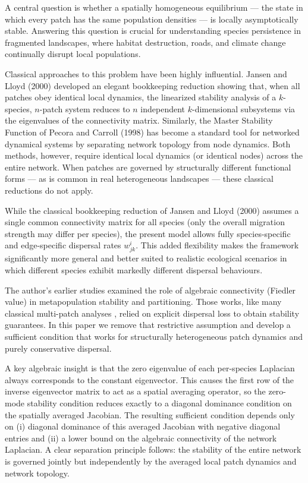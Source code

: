 \documentclass[12pt,a4paper]{article}
\theoremstyle{definition}
\begin{document}
A central question is whether a spatially homogeneous equilibrium --- the state in which every patch has the same population densities --- is locally asymptotically stable. Answering this question is crucial for understanding species persistence in fragmented landscapes, where habitat destruction, roads, and climate change continually disrupt local populations.

Classical approaches to this problem have been highly influential. Jansen and Lloyd (2000) developed an elegant bookkeeping reduction showing that, when all patches obey identical local dynamics, the linearized stability analysis of a \(k\)-species, \(n\)-patch system reduces to \(n\) independent \(k\)-dimensional subsystems via the eigenvalues of the connectivity matrix. Similarly, the Master Stability Function of Pecora and Carroll (1998) has become a standard tool for networked dynamical systems by separating network topology from node dynamics. Both methods, however, require identical local dynamics (or identical nodes) across the entire network. When patches are governed by structurally different functional forms --- as is common in real heterogeneous landscapes --- these classical reductions do not apply.

While the classical bookkeeping reduction of Jansen and Lloyd (2000) assumes a single common connectivity matrix for all species (only the overall migration strength may differ per species), the present model allows fully species-specific and edge-specific dispersal rates $  w^i_{jk}  $. This added flexibility makes the framework significantly more general and better suited to realistic ecological scenarios in which different species exhibit markedly different dispersal behaviours.

The author's earlier studies \cite{kumar2019,kumar2021} examined the role of algebraic connectivity (Fiedler value) in metapopulation stability and partitioning. Those works, like many classical multi-patch analyses \cite{ruxton1997,briggs2004}, relied on explicit dispersal loss to obtain stability guarantees. In this paper we remove that restrictive assumption and develop a sufficient condition that works for structurally heterogeneous patch dynamics and purely conservative dispersal.

A key algebraic insight is that the zero eigenvalue of each per-species Laplacian always corresponds to the constant eigenvector. This causes the first row of the inverse eigenvector matrix to act as a spatial averaging operator, so the zero-mode stability condition reduces exactly to a diagonal dominance condition on the spatially averaged Jacobian. The resulting sufficient condition depends only on (i) diagonal dominance of this averaged Jacobian with negative diagonal entries and (ii) a lower bound on the algebraic connectivity of the network Laplacian. A clear separation principle follows: the stability of the entire network is governed jointly but independently by the averaged local patch dynamics and network topology.
\end{document}
